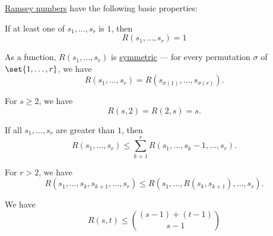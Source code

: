 \begin{proposition}\label{thm:def:ramsey_number}
  \hyperref[def:ramsey_number]{Ramsey numbers} have the following basic properties:
  \begin{thmenum}
     If at least one of \( s_1, \ldots, s_r \) is \( 1 \), then
    \begin{equation}\label{eq:thm:def:ramsey_number/one}
      R(s_1, \ldots, s_r) = 1
    \end{equation}

     As a function, \( R(s_1, \ldots, s_r) \) is \hyperref[def:symmetric_function]{symmetric} --- for every permutation \( \sigma \) of \( \set{ 1, \ldots, r } \), we have
    \begin{equation}\label{eq:thm:def:ramsey_number/symmetric}
      R(s_1, \ldots, s_r) = R(s_{\sigma(1)}, \ldots, s_{\sigma(r)}).
    \end{equation}

     For \( s \geq 2 \), we have
    \begin{equation}\label{eq:thm:def:ramsey_number/two}
      R(s, 2) = R(2, s) = s.
    \end{equation}

     If all \( s_1, \ldots, s_r \) are greater than \( 1 \), then
    \begin{equation}\label{eq:thm:def:ramsey_number/triangle}
      R(s_1, \ldots, s_r) \leq \sum_{k=1}^r R(s_1, \ldots, s_k - 1, \ldots, s_r).
    \end{equation}

     For \( r > 2 \), we have
    \begin{equation}\label{eq:thm:def:ramsey_number/superposition}
      R(s_1, \ldots, s_k, s_{k+1}, \ldots, s_r) \leq R(s_1, \ldots, R(s_k, s_{k+1}), \ldots, s_r).
    \end{equation}

     We have
    \begin{equation}\label{eq:thm:def:ramsey_number/binary_bound}
      R(s, t) \leq \binom { (s - 1) + (t - 1) } { s - 1 }
    \end{equation}
  \end{thmenum}
\end{proposition}
